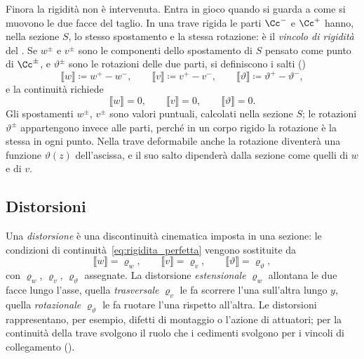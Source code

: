 Finora la rigidità non è intervenuta. Entra in gioco
quando si guarda a come si muovono le due facce del
taglio. In una trave rigida le parti $\Cc^-$ e $\Cc^+$
hanno, nella sezione $S$, lo stesso spostamento e la
stessa rotazione: è il \emph{vincolo di
	rigidità} del
. Se $w^\pm$ e $v^\pm$ sono le
componenti dello spostamento di $S$ pensato come punto
di $\Cc^\pm$, e $\vartheta^\pm$ sono le rotazioni delle
due parti, si definiscono i salti
()
\begin{equation}\label{eq:salti_cinematici}
	\llbracket w \rrbracket \coloneqq w^+ - w^-, \qquad
	\llbracket v \rrbracket \coloneqq v^+ - v^-, \qquad
	\llbracket \vartheta \rrbracket \coloneqq \vartheta^+ - \vartheta^-,
\end{equation}
e la continuità richiede
\begin{equation}\label{eq:rigidita_perfetta}
	\llbracket w \rrbracket = 0, \qquad
	\llbracket v \rrbracket = 0, \qquad
	\llbracket \vartheta \rrbracket = 0.
\end{equation}
Gli spostamenti $w^\pm$, $v^\pm$ sono valori puntuali,
calcolati nella sezione $S$; le rotazioni $\vartheta^\pm$
appartengono invece alle parti, perché in un corpo rigido
la rotazione è la stessa in ogni punto. Nella trave
deformabile anche la rotazione diventerà una funzione
$\vartheta(z)$ dell'ascissa, e il suo salto dipenderà
dalla sezione come quelli di $w$ e di $v$.

\subsection{Distorsioni}
\label{sec:distorsioni}

Una \emph{distorsione} è una
discontinuità cinematica imposta in una sezione: le
condizioni di continuità~\eqref{eq:rigidita_perfetta}
vengono sostituite da
\begin{equation}\label{eq:distorsioni}
	\llbracket w \rrbracket = \varrho_w, \qquad
	\llbracket v \rrbracket = \varrho_v, \qquad
	\llbracket \vartheta \rrbracket = \varrho_\vartheta,
\end{equation}
con $\varrho_w$, $\varrho_v$, $\varrho_\vartheta$
assegnate.
La distorsione \emph{estensionale}
$\varrho_w$ allontana le due facce lungo l'asse, quella
\emph{trasversale}
$\varrho_v$ le fa scorrere l'una sull'altra lungo $y$,
quella \emph{rotazionale}
$\varrho_\vartheta$ le fa ruotare l'una rispetto
all'altra. Le distorsioni rappresentano, per esempio,
difetti di montaggio o l'azione di attuatori; per la
continuità della trave svolgono il ruolo che i cedimenti
svolgono per i vincoli di collegamento
().


